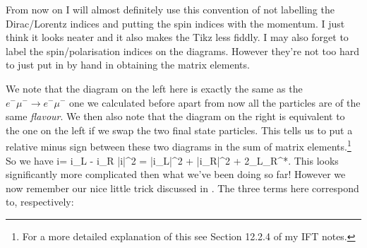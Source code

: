 \br 
    From now on I will almost definitely use this convention of not labelling the Dirac/Lorentz indices and putting the spin indices with the momentum. I just think it looks neater and it also makes the Tikz less fiddly. I may also forget to label the spin/polarisation indices on the diagrams. However they're not too hard to just put in by hand in obtaining the matrix elements.
\er 

We note that the diagram on the left here is exactly the same as the $e^-\mu^-\to e^-\mu^-$ one we calculated before apart from now all the particles are of the same \textit{flavour}. We then also note that the diagram on the right is equivalent to the one on the left if we swap the two final state particles. This tells us to put a relative minus sign between these two diagrams in the sum of matrix elements.\footnote{For a more detailed explanation of this see Section 12.2.4 of my IFT notes.} So we have 
\bse 
    i\cM = i\cM_L - i\cM_R \qquad \implies \qquad |i\cM|^2 = |i\cM_L|^2 + |i\cM_R|^2 + 2\Re \cM_L\cM_R^*.
\ese 
This looks significantly more complicated then what we've been doing so far! However we now remember our nice little trick discussed in . The three terms here correspond to, respectively:
